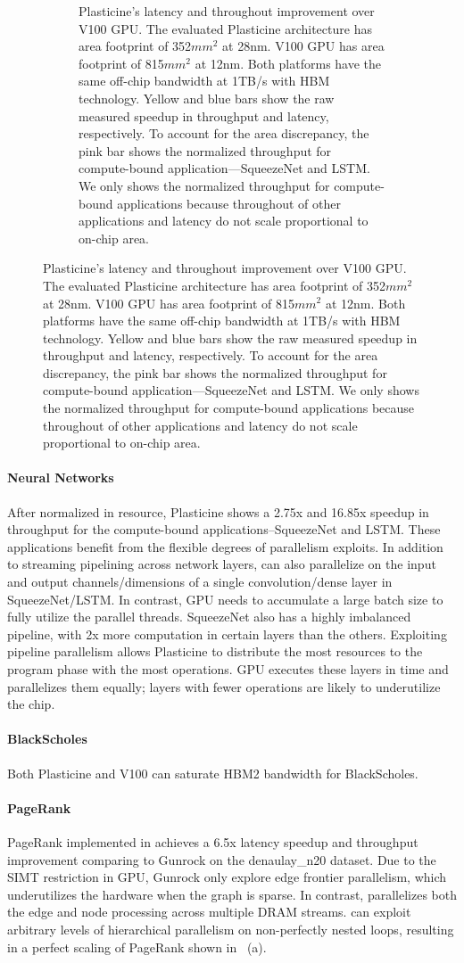 \begin{figure}
\begin{figure}[H]
\caption[Performance comparison with a Tesla V100 GPU]{
  Plasticine's latency and throughout improvement over V100 GPU.
  The evaluated Plasticine architecture has area footprint of 352$mm^2$ at 28nm.
  V100 GPU has area footprint of 815$mm^2$ at 12nm.
  Both platforms have the same off-chip bandwidth at 1TB/s with HBM technology.
  Yellow and blue bars show the raw measured speedup in throughput and latency, respectively.
  To account for the area discrepancy, the pink bar shows the normalized throughput
  for compute-bound application---SqueezeNet and LSTM.
  We only shows the normalized throughput for compute-bound applications because throughout of
  other applications and latency do not scale proportional to on-chip area.
}
\label{fig:speedup}
\end{figure}
\end{figure}

\paragraph{Neural Networks} 
After normalized in resource, Plasticine shows a 2.75x and 16.85x speedup in throughput for the
compute-bound applications--SqueezeNet and LSTM.
These applications benefit from the flexible degrees of parallelism \name{} exploits. 
In addition to streaming pipelining across network layers, \name can also parallelize on the
input and output channels/dimensions of a single convolution/dense layer in SqueezeNet/LSTM.
In contrast, GPU needs to accumulate a large batch size to fully utilize the parallel threads.
SqueezeNet also has a highly imbalanced pipeline, with 2x more computation in certain layers than
the others.
Exploiting pipeline parallelism allows Plasticine to distribute the most resources to the program
phase with the most operations.
GPU executes these layers in time and parallelizes them equally; 
layers with fewer operations are likely to underutilize the chip.

\paragraph{BlackScholes} 
Both Plasticine and V100 can saturate HBM2 bandwidth for BlackScholes.

\paragraph{PageRank} 
PageRank implemented in \name achieves a 6.5x latency speedup and throughput improvement comparing
to Gunrock \cite{gunrock} on the denaulay\_n20 \cite{delaunayn20} dataset. 
Due to the SIMT restriction in GPU, Gunrock only explore edge frontier parallelism, 
which underutilizes the hardware when the graph is sparse.
In contrast, \name{} parallelizes both the edge and node processing across multiple DRAM streams.
\name can exploit arbitrary levels of hierarchical parallelism on non-perfectly nested loops,
resulting in a perfect scaling of PageRank shown in~ (a).


